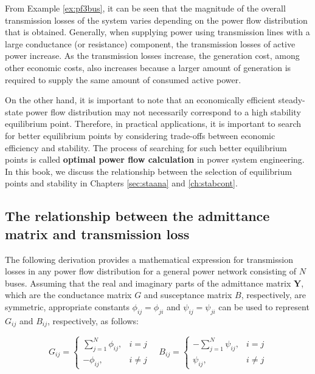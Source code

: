 \documentclass[graybox, envcountchap]{svmult}
\begin{document}
From Example \ref{ex:pf3bus}, it can be seen that the magnitude of the overall
transmission losses of the system varies depending on the power flow
distribution that is obtained. Generally, when supplying power using
transmission lines with a large conductance (or resistance) component, the
transmission losses of active power increase. As the transmission losses
increase, the generation cost, among other economic costs, also increases
because a larger amount of generation is required to supply the same amount of
consumed active power.

On the other hand, it is important to note that an economically efficient
steady-state power flow distribution may not necessarily correspond to a high
stability equilibrium point. Therefore, in practical applications, it is
important to search for better equilibrium points by considering trade-offs
between economic efficiency and stability. The process of searching for such
better equilibrium points is called \textbf{optimal power flow calculation} in
power system engineering. In this book, we discuss the relationship between the
selection of equilibrium points and stability in Chapters \ref{sec:staana} and
\ref{ch:stabcont}.

\subsection{The relationship between the admittance matrix and transmission
loss\advanced}

The following derivation provides a mathematical expression for transmission
losses in any power flow distribution for a general power network consisting of
$N$ buses. Assuming that the real and imaginary parts of the admittance matrix
$\bm{Y}$, which are the conductance matrix $G$ and susceptance matrix $B$,
respectively, are symmetric, appropriate constants $\phi_{ij}=\phi_{ji}$ and
$\psi_{ij}=\psi_{ji}$ can be used to represent $G_{ij}$ and $B_{ij}$,
respectively, as follows:

\begin{equation}\label{eq:GBrep}
  G_{ij} =
  \left\{
    \begin{array}{cl}
      \textstyle \sum_{j=1}^{N} \phi_{ij}, & i=j \\
      -\phi_{ij}, & i\neq j 
    \end{array}
  \right.
  \quad
  B_{ij}  =
  \left\{
    \begin{array}{cl}
      \textstyle - \sum_{j=1}^{N} \psi_{ij}, & i=j \\
      \psi_{ij}, & i\neq j 
    \end{array}
  \right.
\end{equation}
\end{document}
